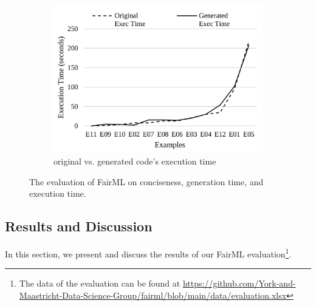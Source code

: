 \documentclass[sigconf,review]{acmart}
\begin{document}
{\begin{figure}
\begin{subfigure}{0.33\textwidth}
			\includegraphics[width=\textwidth]{figures/eval-execution-time.pdf}
			\caption{original vs. generated code's execution time}
			\label{fig:eval-execution-time}
		\end{subfigure}
		\caption{The evaluation of FairML on conciseness, generation time, and execution time.}
		\label{fig:evaluation}
	\end{figure}
	
	
	\subsection{Results and Discussion}
	\label{sec:result_and_discussion}
	In this section, we present and discuss the results of our FairML evaluation\footnote{The data of the evaluation can be found at \url{https://github.com/York-and-Maastricht-Data-Science-Group/fairml/blob/main/data/evaluation.xlsx}}.
	
}
\end{document}
